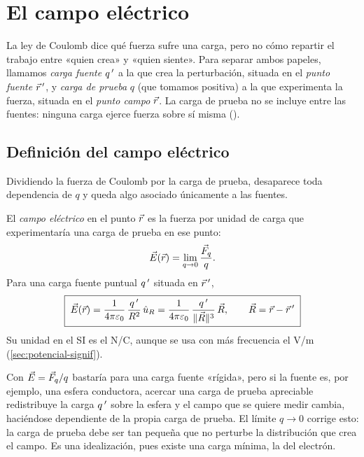 \section{El campo eléctrico}\label{sec:campo}
La ley de Coulomb dice qué fuerza sufre una carga, pero no cómo repartir el trabajo entre «quien crea» y
«quien siente». Para separar ambos papeles, llamamos \emph{carga fuente} $q\,'$ a la que crea la perturbación,
situada en el \emph{punto fuente} $\vec{r}\,'$, y \emph{carga de prueba} $q$ (que tomamos positiva) a la que
experimenta la fuerza, situada en el \emph{punto campo} $\vec{r}$. La carga de prueba no se incluye entre las
fuentes: ninguna carga ejerce fuerza sobre sí misma ().

\subsection{Definición del campo eléctrico}\label{sec:def-campo}
Dividiendo la fuerza de Coulomb por la carga de prueba, desaparece toda dependencia de $q$ y queda algo asociado
únicamente a las fuentes.

\begin{definicion}\label{def:campo}
El \emph{campo eléctrico} en el punto $\vec{r}$ es la fuerza por unidad de carga que experimentaría una carga de prueba
en ese punto:
\begin{equation}\label{eq:campo-def}
  \vec{E}(\vec{r})=\lim_{q\to0}\frac{\vec{F}_q}{q}.
\end{equation}
Para una carga fuente puntual $q\,'$ situada en $\vec{r}\,'$,
\begin{equation}\label{eq:campo-puntual}
  \boxed{\;\vec{E}(\vec{r})=\frac{1}{4\pi\varepsilon_{0}}\,\frac{q\,'}{R^{2}}\,\hat{u}_{R}
  =\frac{1}{4\pi\varepsilon_{0}}\,\frac{q\,'}{\lVert \vec{R}\rVert^{3}}\,\vec{R},\qquad\vec{R}=\vec{r}-\vec{r}\,'\;}
\end{equation}
Su unidad en el SI es el N/C, aunque se usa con más frecuencia el V/m (\cref{sec:potencial-signif}).
\end{definicion}

\begin{observacion}\label{obs:limite}
Con $\vec{E}=\vec{F}_q/q$ bastaría para una carga fuente «rígida», pero si la fuente es, por ejemplo, una esfera
conductora, acercar una carga de prueba apreciable redistribuye la carga $q\,'$ sobre la esfera y el campo que
se quiere medir cambia, haciéndose dependiente de la propia carga de prueba. El límite $q\to0$ corrige esto: la
carga de prueba debe ser tan pequeña que no perturbe la distribución que crea el campo. Es una idealización, pues
existe una carga mínima, la del electrón.
\end{observacion}

